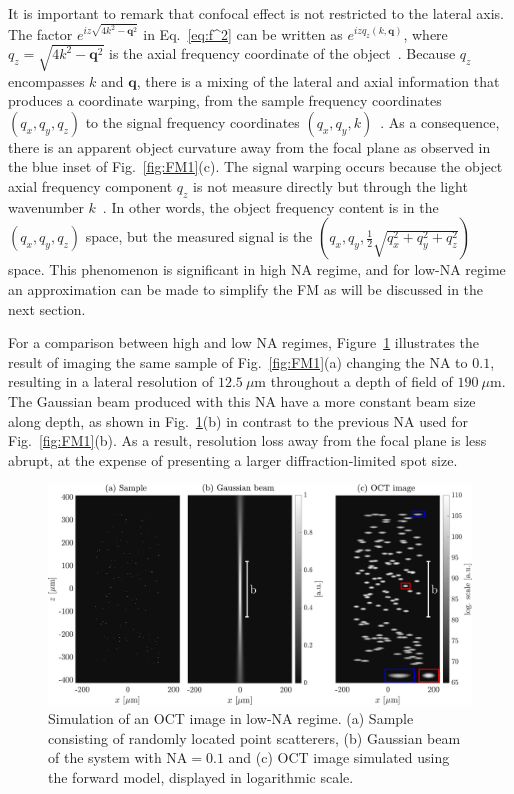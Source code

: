 It is important to remark that confocal effect is not restricted to the lateral axis. The factor $e^{iz\sqrt{4k^2-\mathbf{q}^2}}$ in Eq.~\eqref{eq:f^2} can be written as $e^{izq_z(k, \mathbf{q})}$, where $q_z=\sqrt{4k^2-\mathbf{q}^2}$ is the axial frequency coordinate of the object~\cite{Davis2007_Nonparaxial}. Because $q_z$ encompasses $k$ and $\mathbf{q}$, there is a mixing of the lateral and axial information that produces a coordinate warping, from the sample frequency coordinates $(q_x, q_y, q_z)$ to the signal frequency coordinates $(q_x, q_y, k)$~\cite{Ralston2006_Inverse}. As a consequence, there is an apparent object curvature away from the focal plane as observed in the blue inset of Fig.~\ref{fig:FM1}(c). The signal warping occurs because the object axial frequency component $q_z$ is not measure directly but through the light wavenumber $k$~\cite{Fercher2003_Optical}. In other words, the object frequency content is in the $(q_x, q_y, q_z)$ space, but the measured signal is the $(q_x, q_y, \frac{1}{2}\sqrt{q_x^2 + q_y^2 + q_z^2})$ space. This phenomenon is significant in high NA regime, and for low-NA regime an approximation can be made to simplify the FM as will be discussed in the next section.

For a comparison between high and low NA regimes, Figure~\ref{fig:FM2} illustrates the result of imaging the same sample of Fig.~\ref{fig:FM1}(a) changing the NA to $0.1$, resulting in a lateral resolution of $ 12.5~\mu$m throughout a depth of field of $190~\mu$m. The Gaussian beam produced with this NA have a more constant beam size along depth, as shown in Fig.~\ref{fig:FM2}(b) in contrast to the previous NA used for Fig.~\ref{fig:FM1}(b). As a result, resolution loss away from the focal plane is less abrupt, at the expense of presenting a larger diffraction-limited spot size.

\begin{figure}[htb!]
    \centering
    \includegraphics[width=\textwidth]{Figures/TheoreticalBasis/FM-LowNA.pdf}
    \caption[Simulation of an OCT image in low-NA regime.]{Simulation of an OCT image in low-NA regime. (a) Sample consisting of randomly located point scatterers, (b) Gaussian beam of the system with NA$=0.1$ and (c) OCT image simulated using the forward model, displayed in logarithmic scale.}
    \label{fig:FM2}
\end{figure}

